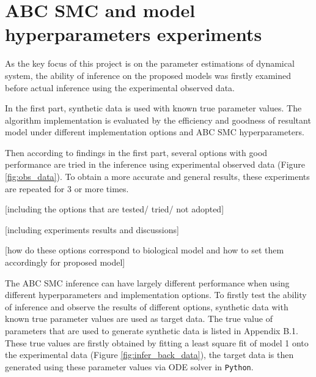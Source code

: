 \documentclass[12pt,a4paper]{report}
\begin{document}








\section{ABC SMC and model hyperparameters experiments}

As the key focus of this project is on the parameter estimations of dynamical system, the ability of inference on the proposed models was firstly examined before actual inference using the experimental observed data.

In the first part, synthetic data is used with known true parameter values. The algorithm implementation is evaluated by the efficiency and goodness of resultant model under different implementation options and ABC SMC hyperparameters.

Then according to findings in the first part, several options with good performance are tried in the inference using experimental observed data (Figure \ref{fig:obs_data}). To obtain a more accurate and general results, these experiments are repeated for 3 or more times.

    [including the options that are tested/ tried/ not adopted]

    [including experiments results and discussions]

    [how do these options correspond to biological model and how to set them accordingly for proposed model]

The ABC SMC inference can have largely different performance when using different hyperparameters and implementation options. To firstly test the ability of inference and observe the results of different options, synthetic data with known true parameter values are used as target data. The true value of parameters that are used to generate synthetic data is listed in Appendix B.1. These true values are firstly obtained by fitting a least square fit of model 1 onto the experimental data (Figure \ref{fig:infer_back_data}), the target data is then generated using these parameter values via ODE solver in \verb|Python|.
\end{document}
